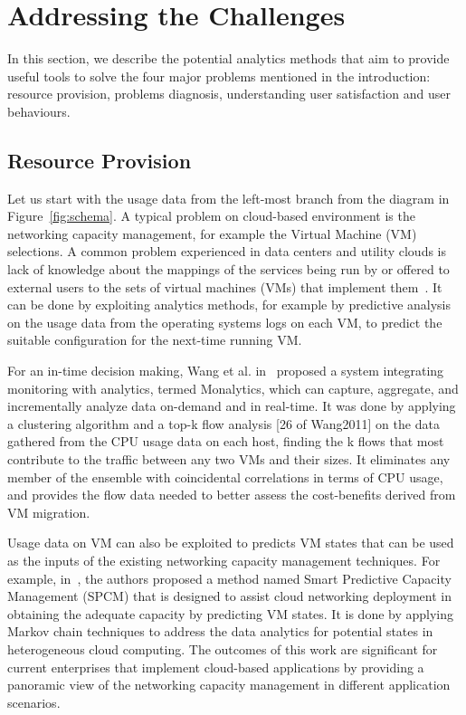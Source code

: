 \section{Addressing the Challenges}
In this section, we describe the potential analytics methods that aim to provide useful tools to solve the four major problems mentioned in the introduction: resource provision, problems diagnosis, understanding user satisfaction and user behaviours.

\subsection{Resource Provision}
Let us start with the usage data from the left-most branch from the diagram in Figure~\ref{fig:schema}. A typical problem on cloud-based environment is the networking capacity management, for example the Virtual Machine (VM) selections. A common problem experienced in data centers and utility clouds is lack of knowledge about the mappings of the services being run by or offered to external users to the sets of virtual machines (VMs) that implement them~\cite{Wang2011}. It can be done by exploiting analytics methods, for example by predictive analysis on the usage data from the operating systems logs on each VM, to predict the suitable configuration for the next-time running VM.   

For an in-time decision making, Wang et al. in~\cite{Wang2011} proposed a system integrating monitoring with analytics, termed Monalytics, which can capture, aggregate, and incrementally analyze data on-demand and in real-time. It was done by applying a clustering algorithm and a top-k flow analysis [26 of Wang2011] on the data gathered from the CPU usage data on each host, finding the k flows that most contribute to the traffic between any two VMs and their sizes. It eliminates any member of the ensemble with coincidental correlations in terms of CPU usage, and provides the flow data needed to better assess the cost-benefits derived from VM migration.
 
 Usage data on VM can also be exploited to predicts VM states that can be used as the inputs of the existing networking capacity management techniques. For example, in~\cite{Sun2016}, the authors proposed a method named Smart Predictive Capacity Management (SPCM) that is designed to assist cloud networking deployment in obtaining the adequate capacity by predicting VM states. It is done by applying Markov chain techniques to address the data analytics for potential states in heterogeneous cloud computing. The outcomes of this work are significant for current enterprises that implement cloud-based applications by providing a panoramic view of the networking capacity management in different application scenarios.
 


